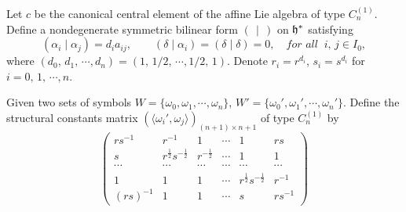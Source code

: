 \documentclass{amsproc}
\theoremstyle{remark}
\numberwithin{equation}{section}
\begin{document}
Let $c$ be the canonical central element of the affine Lie algebra of
type $C_n^{(1)}$. Define a  nondegenerate
symmetric bilinear form $(\,  \mid \,)$ on ${\frak{h^*}}$ satisfying
$$(\alpha_i\mid \alpha_j)=d_ia_{ij}, \qquad (\delta \mid \alpha_i)=(\delta\mid \delta)=0, \quad
\textit {for all } \ i,\,j \in I_0,$$ where
$(d_0,\,d_1,\,\cdots, d_n)=(1,\,1/2,\,\cdots, 1/2,\, 1)$. Denote $r_i = r^{d_i}$, $s_i =
s^{d_i}$ for $i=0,\,1,\,\cdots, n$.

Given two sets of symbols $W=\{\omega_0,\omega_1, \cdots,\omega_n\}$,
$W'=\{\omega_0',\omega_1', \cdots, \omega_n'\}$. Define the structural
constants matrix $(\langle \omega_i',\omega_j \rangle)_{(n+1)\times
{n+1}}$ of type $C_n^{(1)}$ by
$$\left(\begin{array}{cccccc}
rs^{-1}& r^{-1}& 1 & \cdots & 1 & rs \\
s & r^{\frac{1}{2}}s^{-\frac{1}{2}} & r^{-\frac{1}{2}}  & \cdots & 1 & 1\\
\cdots &\cdots &\cdots & \cdots & \cdots & \cdots\\
1 & 1 & 1  & \cdots & r^{\frac{1}{2}}s^{-\frac{1}{2}} & r^{-1}\\
 (rs)^{-1} & 1 & 1 & \cdots & s & rs^{-1}
\end{array}\right)$$
\end{document}
